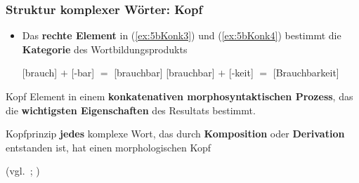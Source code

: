 \begin{frame}
\frametitle{Struktur komplexer Wörter: Kopf}


\begin{itemize}
	\item Das \textbf{rechte Element} in (\ref{ex:5bKonk3}) und (\ref{ex:5bKonk4}) bestimmt die \textbf{Kategorie} des Wortbildungsprodukts %
	
\ea 
	\ea\label{ex:5bKonk3} {[brauch] $+$ [-bar] $=$ [brauchbar]}
	\ex\label{ex:5bKonk4} {[brauchbar] $+$ [-keit] $=$ [Brauchbarkeit]}
	\z 
\z 

\end{itemize}

\pause 
	
\begin{block}{Kopf}
	Element in einem \textbf{konkatenativen morphosyntaktischen Prozess}, das die \textbf{wichtigsten Eigenschaften} des Resultats bestimmt. 

\end{block}	

\begin{block}{Kopfprinzip}
	\textbf{jedes} komplexe Wort, das durch \textbf{Komposition} oder \textbf{Derivation} entstanden ist, hat einen morphologischen Kopf
\end{block}	

\hfill (vgl.\ \citealp[76]{Olsen86a}; \citealp[]{MyP18b})
	
\end{frame}


